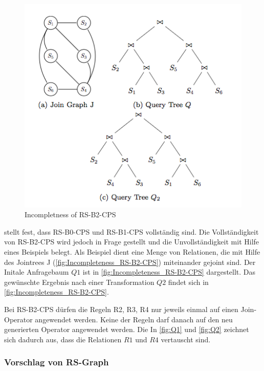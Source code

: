 \begin{figure}[h]
  \centering
  \includegraphics[width=\textwidth]{03_Related_Work/Incompleteness_RS-B2-CPS.png}
  \caption{Incompletness of RS-B2-CPS}
  \label{Incompleteness_RS-B2-CPS}
\end{figure}


\cite{shanbhag2014optimizing} stellt fest, dass RS-B0-CPS und RS-B1-CPS vollständig sind. Die Vollständigkeit von RS-B2-CPS wird jedoch in Frage gestellt und die Unvollständigkeit mit Hilfe eines Beispiels belegt. Als Beispiel dient eine Menge von Relationen, die mit Hilfe des Jointrees J (\ref{fig:Incompleteness_RS-B2-CPS}) miteinander gejoint sind. Der Initale Anfragebaum $Q1$ ist in \ref{fig:Incompleteness_RS-B2-CPS} dargestellt. Das gewünschte Ergebnis nach einer Transformation $Q2$  findet sich in \ref{fig:Incompleteness_RS-B2-CPS}. 

Bei RS-B2-CPS dürfen die Regeln R2, R3, R4 nur jeweils einmal auf einen Join-Operator angewendet werden. Keine der Regeln darf danach auf den neu generierten Operator angewendet werden. Die In \ref{fig:Q1} und \ref{fig:Q2} zeichnet sich dadurch aus, dass die Relationen $R1$ und $R4$ vertauscht sind.







\subsubsection{Vorschlag von RS-Graph}

